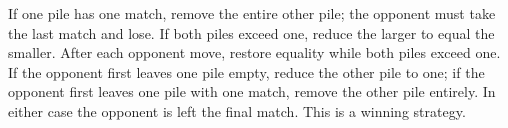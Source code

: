 If one pile has one match, remove the entire other pile; the opponent must take the last match and lose. If both piles exceed one, reduce the larger to equal the smaller. After each opponent move, restore equality while both piles exceed one. If the opponent first leaves one pile empty, reduce the other pile to one; if the opponent first leaves one pile with one match, remove the other pile entirely. In either case the opponent is left the final match. This is a winning strategy.
